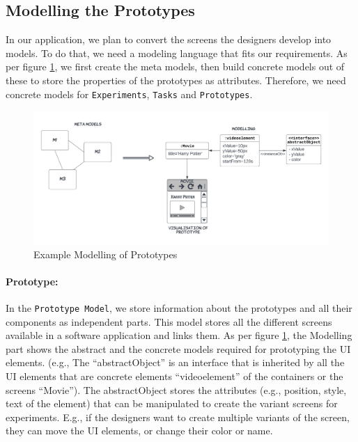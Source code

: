 \subsection{Modelling the Prototypes}
\label{solutionideas:subsection:modelling}

In our application, we plan to convert the screens the designers develop into models. 
To do that, we need a modeling language that fits our requirements. As per figure \ref{solutionideas:fig:metamodel}, we first create the meta models, then build concrete models out of these to store the properties of the prototypes as attributes.
Therefore, we need concrete models for \texttt{Experiments}, \texttt{Tasks} and \texttt{Prototypes}.

\begin{figure}[bt]
	\centering
  \includegraphics[width=1.05\textwidth]{images/solution-ideas/MetaModel.png}
	\caption{Example Modelling of Prototypes}
	\label{solutionideas:fig:metamodel}
\end{figure}

\paragraph{Prototype:} In the \texttt{Prototype Model}, we store information about the prototypes and all their components as independent parts.
This model stores all the different screens available in a software application and links them.
As per figure \ref{solutionideas:fig:metamodel}, the Modelling part shows the abstract and the concrete models required for prototyping the UI elements. 
(e.g., The ``abstractObject'' is an interface that is inherited by all the UI elements that are concrete elements ``videoelement'' of the containers or the screens ``Movie'').
The abstractObject stores the attributes (e.g., position, style, text of the element) that can be manipulated to create the variant screens for experiments.
E.g., if the designers want to create multiple variants of the screen, they can move the UI elements, or change their color or name.

